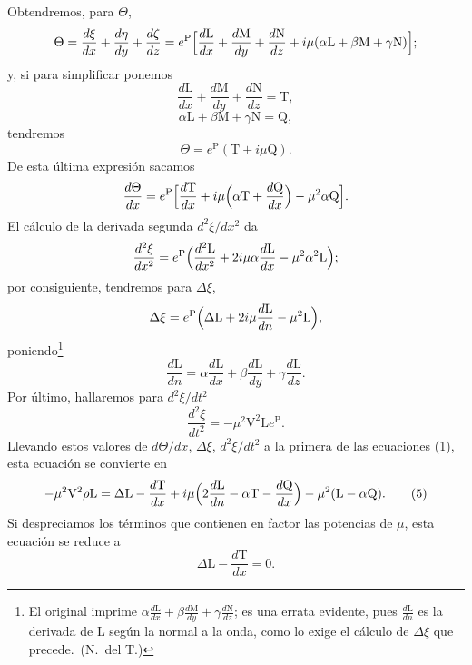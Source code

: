 Obtendremos, para $\Theta$,
\[
\Theta=\frac{d\xi}{dx}+\frac{d\eta}{dy}+\frac{d\zeta}{dz}
=e^{\mathrm P}\Bigl[\frac{d\mathrm L}{dx}+\frac{d\mathrm M}{dy}+\frac{d\mathrm N}{dz}
+i\mu(\alpha \mathrm L+\beta \mathrm M+\gamma \mathrm N)\Bigr];
\]
y, si para simplificar ponemos
\begin{equation}
\frac{d\mathrm L}{dx}+\frac{d\mathrm M}{dy}+\frac{d\mathrm N}{dz}=\mathrm T,
\tag{3}
\end{equation}
\begin{equation}
\alpha \mathrm L+\beta \mathrm M+\gamma \mathrm N=\mathrm Q,
\tag{4}
\end{equation}
tendremos
\[
\Theta=e^{\mathrm P}(\mathrm T+i\mu \mathrm Q).
\]
De esta última expresión sacamos
\[
\frac{d\Theta}{dx}=e^{\mathrm P}\Bigl[\frac{d\mathrm T}{dx}+i\mu\Bigl(\alpha \mathrm T+\frac{d\mathrm Q}{dx}\Bigr)-\mu^2\alpha \mathrm Q\Bigr].
\]
El cálculo de la derivada segunda $d^2\xi/dx^2$ da
\[
\frac{d^2\xi}{dx^2}=e^{\mathrm P}\Bigl(\frac{d^2\mathrm L}{dx^2}+2i\mu\alpha\frac{d\mathrm L}{dx}-\mu^2\alpha^2\mathrm L\Bigr);
\]
por consiguiente, tendremos para $\Delta\xi$,
\[
\Delta\xi=e^{\mathrm P}\Bigl(\Delta \mathrm L+2i\mu\frac{d\mathrm L}{dn}-\mu^2\mathrm L\Bigr),
\]
poniendo\footnote{El original imprime
$\alpha\frac{d\mathrm L}{dx}+\beta\frac{d\mathrm M}{dy}+\gamma\frac{d\mathrm N}{dz}$;
es una errata evidente, pues $\frac{d\mathrm L}{dn}$ es la derivada de
$\mathrm L$ según la normal a la onda, como lo exige el cálculo de
$\Delta\xi$ que precede.~(N.~del T.)}
\[
\frac{d\mathrm L}{dn}=\alpha\frac{d\mathrm L}{dx}+\beta\frac{d\mathrm L}{dy}+\gamma\frac{d\mathrm L}{dz}.
\]
Por último, hallaremos para $d^2\xi/dt^2$
\[
\frac{d^2\xi}{dt^2}=-\mu^2\mathrm V^2\mathrm Le^{\mathrm P}.
\]
Llevando estos valores de $d\Theta/dx$, $\Delta\xi$, $d^2\xi/dt^2$ a la
primera de las ecuaciones (1), esta ecuación se convierte en
\begin{equation}
-\mu^2\mathrm V^2\rho \mathrm L=\Delta \mathrm L-\frac{d\mathrm T}{dx}
+i\mu\Bigl(2\frac{d\mathrm L}{dn}-\alpha \mathrm T-\frac{d\mathrm Q}{dx}\Bigr)-\mu^2(\mathrm L-\alpha \mathrm Q).
\tag{5}
\end{equation}
Si despreciamos los términos que contienen en factor las potencias de
$\mu$, esta ecuación se reduce a
\begin{equation}
\Delta \mathrm L-\frac{d\mathrm T}{dx}=0.
\tag{6}
\end{equation}

